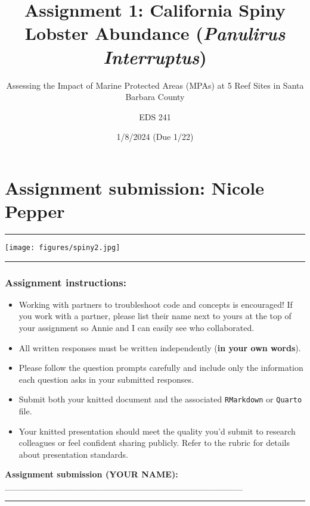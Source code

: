 \documentclass[
]{article}
\title{Assignment 1: California Spiny Lobster Abundance (\emph{Panulirus
Interruptus})}
\subtitle{Assessing the Impact of Marine Protected Areas (MPAs) at 5
Reef Sites in Santa Barbara County}
\author{EDS 241}
\date{1/8/2024 (Due 1/22)}
\begin{document}
\maketitle

\section{Assignment submission: Nicole
Pepper}\label{assignment-submission-nicole-pepper}

\begin{center}\rule{0.5\linewidth}{0.5pt}\end{center}

\texttt{[image: figures/spiny2.jpg]}

\begin{center}\rule{0.5\linewidth}{0.5pt}\end{center}

\subsubsection{Assignment instructions:}\label{assignment-instructions}

\begin{itemize}
\item
  Working with partners to troubleshoot code and concepts is encouraged!
  If you work with a partner, please list their name next to yours at
  the top of your assignment so Annie and I can easily see who
  collaborated.
\item
  All written responses must be written independently (\textbf{in your
  own words}).
\item
  Please follow the question prompts carefully and include only the
  information each question asks in your submitted responses.
\item
  Submit both your knitted document and the associated
  \texttt{RMarkdown} or \texttt{Quarto} file.
\item
  Your knitted presentation should meet the quality you'd submit to
  research colleagues or feel confident sharing publicly. Refer to the
  rubric for details about presentation standards.
\end{itemize}

\textbf{Assignment submission (YOUR NAME):}
\_\_\_\_\_\_\_\_\_\_\_\_\_\_\_\_\_\_\_\_\_\_\_\_\_\_\_\_\_\_\_\_\_\_\_\_\_\_

\begin{center}\rule{0.5\linewidth}{0.5pt}\end{center}
\end{document}
